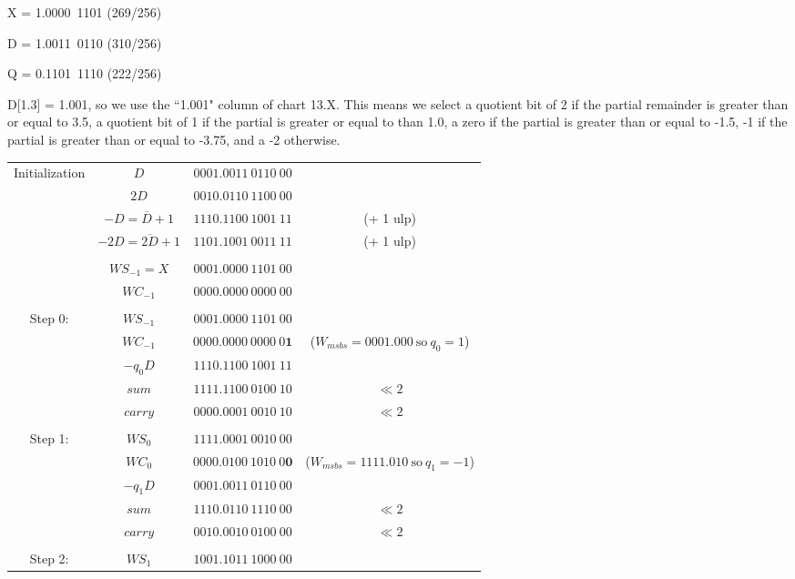 \documentclass[12pt]{article}
\begin{document}
X = 1.0000\ 1101 (269/256)

D = 1.0011\ 0110 (310/256)

Q = 0.1101\ 1110 (222/256)

D[1.3] = 1.001, so we use the ``1.001" column of chart 13.X. This means we select a quotient bit of 2 if the partial remainder is greater than or equal to 3.5, a quotient bit of 1 if the partial is greater or equal to than 1.0, a zero if the partial is greater than or equal to -1.5, -1 if the partial is greater than or equal to -3.75, and a -2 otherwise.

{\small
\begin{center}
\begin{tabular}{cccc}
    Initialization&$D$&$0001.0011\ 0110\ 00$&\\
    &$2D$&$0010.0110\ 1100\ 00$&\\
    &$-D=\overline{D}+1$&$1110.1100\ 1001\ 11$&(+ 1 ulp)\\
    &$-2D=\overline{2D}+1$&$1101.1001\ 0011\ 11$&(+ 1 ulp)\\
    &&&\\
    &$WS_{-1}=X$&$0001.0000\ 1101\ 00$&\\
    &$WC_{-1}$&$0000.0000\ 0000\ 00$&\\
    \hdashline\\
    Step 0: &$WS_{-1}   $&$0001.0000\ 1101\ 00$&\\
            &$WC_{-1}   $&$0000.0000\ 0000\ 0\mathbf{1}$&($W_{msbs}=0001.000\ \text{so}\ q_0=1$)\\
            &$-q_0D     $&$1110.1100\ 1001\ 11$&\\
    \cline{2-3}
            &$sum       $&$1111.1100\ 0100\ 10$&$\ll2$\\
            &$carry     $&$0000.0001\ 0010\ 10$&$\ll2$\\
    \hdashline\\
    Step 1: &$WS_0      $&$1111.0001\ 0010\ 00$&\\
            &$WC_0      $&$0000.0100\ 1010\ 0\mathbf{0}$&($W_{msbs}=1111.010\ \text{so}\ q_1=-1$)\\
            &$-q_1D     $&$0001.0011\ 0110\ 00$&\\
    \cline{2-3}
            &$sum       $&$1110.0110\ 1110\ 00$&$\ll2$\\
            &$carry     $&$0010.0010\ 0100\ 00$&$\ll2$\\
    \hdashline\\
    Step 2: &$WS_1      $&$1001.1011\ 1000\ 00$&\\

\end{tabular}
\end{center}}
\end{document}
